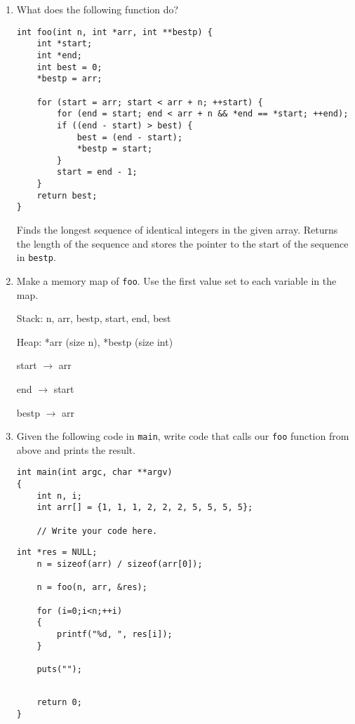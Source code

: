 %
%


\begin{enumerate}
\item What does the following function do?

\begin{lstlisting}
int foo(int n, int *arr, int **bestp) {
	int *start;
	int *end;
	int best = 0;
	*bestp = arr;
	
	for (start = arr; start < arr + n; ++start)	{
		for (end = start; end < arr + n && *end == *start; ++end);
		if ((end - start) > best) {
			best = (end - start);
			*bestp = start;
		}
		start = end - 1;
	}
	return best;
}
\end{lstlisting}

\begin{answer}
Finds the longest sequence of identical integers in the given array.
Returns the length of the sequence and stores the pointer to the start of the sequence in \texttt{bestp}.
\end{answer}

\item Make a memory map of \texttt{foo}. Use the first value set to each variable in the map.

\begin{answer}
Stack: n, arr, bestp, start, end, best

Heap: *arr (size n), *bestp (size int)

start $\rightarrow$ arr

end $\rightarrow$ start

bestp $\rightarrow$ arr
\end{answer}

\vspace{20px}

\item Given the following code in \texttt{main}, write code that calls our \texttt{foo} function from above
and prints the result.
\begin{lstlisting}[numbers=none]
int main(int argc, char **argv)
{
	int n, i;
	int arr[] = {1, 1, 1, 2, 2, 2, 5, 5, 5, 5};

	// Write your code here.
\end{lstlisting}

\begin{answer}
\begin{lstlisting}[numbers=none]
	int *res = NULL;
	n = sizeof(arr) / sizeof(arr[0]);

	n = foo(n, arr, &res);

	for (i=0;i<n;++i)
	{
		printf("%d, ", res[i]);
	}
	
	puts("");
\end{lstlisting}
\end{answer}

\begin{lstlisting}[numbers=none]

	return 0;
}
\end{lstlisting}

\end{enumerate}
